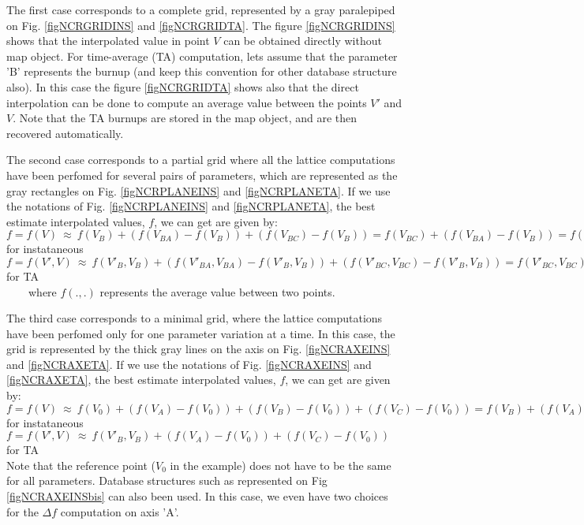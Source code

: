 The first case corresponds to a complete grid, represented by a gray paralepiped on Fig. \ref{figNCRGRIDINS} and \ref{figNCRGRIDTA}. The
figure \ref{figNCRGRIDINS} shows that the interpolated value in point $V$ can be obtained directly without {\sc map} object. For time-average (TA) computation, lets assume that the parameter 'B' represents the burnup (and keep this convention for other database structure also). In this case the figure \ref{figNCRGRIDTA} shows also that the direct interpolation can be done to compute an average value between the points $V'$ and $V$. Note that the TA burnups are stored in the {\sc map} object, and are then recovered automatically.

The second case corresponds to a partial grid where all the lattice computations have been perfomed for several pairs of parameters, which are represented as the gray rectangles on Fig. \ref{figNCRPLANEINS} and \ref{figNCRPLANETA}. If we use the notations of Fig. \ref{figNCRPLANEINS} and \ref{figNCRPLANETA}, the best estimate interpolated values, $f$, we can get are given by: \\
$f=f(V)~\approx~f(V_B)+(f(V_{BA})-f(V_B))+(f(V_{BC})-f(V_B))=f(V_{BC})+(f(V_{BA})-f(V_B))=f(V_{BA})+(f(V_{BC})-f(V_B))$ for instataneous\\
$f=f(V',V)~\approx~f(V'_B,V_B)+(f(V'_{BA},V_{BA})-f(V'_B,V_B))+(f(V'_{BC},V_{BC})-f(V'_B,V_B))=f(V'_{BC},V_{BC})+(f(V'_{BA},V_{BA})-f(V'_B,V_B))=f(V'_{BA},V_{BA})+(f(V'_{BC},V_{BC})-f(V'_B,V_B))$ for TA\\
~~~~where $f(.,.)$ represents the average value between two points.

The third case corresponds to a minimal grid, where the lattice computations have been perfomed only for one parameter variation at a time. In this case, the grid is represented by the thick gray lines on the axis on Fig. \ref{figNCRAXEINS} and \ref{figNCRAXETA}. If we use the notations of Fig. \ref{figNCRAXEINS} and \ref{figNCRAXETA}, the best estimate interpolated values, $f$, we can get are given by: \\
$f=f(V)~\approx~f(V_0)+(f(V_A)-f(V_0))+(f(V_B)-f(V_0))+(f(V_C)-f(V_0))=f(V_B)+(f(V_A)-f(V_0))+(f(V_C)-f(V_0))$ for instataneous\\
$f=f(V',V)~\approx~f(V'_B,V_B)+(f(V_A)-f(V_0))+(f(V_C)-f(V_0))$ for TA\\
Note that the reference point ($V_0$ in the example) does not have to be the same for all parameters. Database structures such as represented on Fig \ref{figNCRAXEINSbis} can also been used. In this case, we even have two choices for the $\Delta f$ computation on axis 'A'. 

